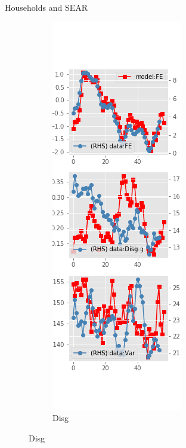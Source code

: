 \documentclass{beamer}
\begin{document}
\begin{frame}{Households and SEAR}
\begin{figure}[ht]
\begin{subfigure}[b]{0.2\textwidth}
		\end{subfigure}
		\hfill
		\begin{subfigure}[b]{0.2\textwidth}
			\caption{Disg}
			\includegraphics[width=\textwidth, height = 0.8\textheight]{figuresDraft/sce_se_est_diag1.png}

\end{subfigure}
\end{figure}
\end{frame}
\end{document}
